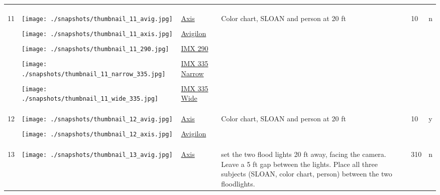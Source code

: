 \documentclass{article}%
\begin{document}
\begin{longtabu}{m{2.5cm} m{4cm} m{2cm} m{4cm} m{2cm} m{2cm}}
&&&&&\\%
&&&&&\\%
\hline%
&&&&&\\%
11&\texttt{[image: ./snapshots/thumbnail\_11\_avig.jpg]}&\href{https://drive.google.com/file/d/1W6dFHP7HQJ4QoIpgM2EtNyqKn5k4SNRU/view?usp=sharing}{Axis}&Color chart, SLOAN and person at 20 ft&10&n\\%
&&&&&\\%
&\texttt{[image: ./snapshots/thumbnail\_11\_axis.jpg]}&\href{https://drive.google.com/file/d/1yZfgjzj-YLJWCmQWwxPci34Pwg6di89s/view?usp=sharing}{Avigilon}&&&\\%
&&&&&\\%
&\texttt{[image: ./snapshots/thumbnail\_11\_290.jpg]}&\href{https://drive.google.com/file/d/1lsPoPlqaHDXXYc023AvWvS7iqQAY0pnQ/view?usp=sharing}{IMX 290}&&&\\%
&&&&&\\%
&\texttt{[image: ./snapshots/thumbnail\_11\_narrow\_335.jpg]}&\href{https://drive.google.com/file/d/1LoEW2xSsvm09DzviGuoz4PA_wF0fnxzy/view?usp=sharing}{IMX 335 Narrow}&&&\\%
&&&&&\\%
&\texttt{[image: ./snapshots/thumbnail\_11\_wide\_335.jpg]}&\href{https://drive.google.com/file/d/1FzmykcKnsG6wl9Zqh4BDBGeRPUZqVfc6/view?usp=sharing}{IMX 335 Wide}&&&\\%
&&&&&\\%
&&&&&\\%
\hline%
&&&&&\\%
12&\texttt{[image: ./snapshots/thumbnail\_12\_avig.jpg]}&\href{https://drive.google.com/file/d/1EOLpj27xyZ4Zt56Bh_ZrP4mSC3IlwukH/view?usp=sharing}{Axis}&Color chart, SLOAN and person at 20 ft&10&y\\%
&&&&&\\%
&\texttt{[image: ./snapshots/thumbnail\_12\_axis.jpg]}&\href{https://drive.google.com/file/d/1pjwAKJIEH6E4j6cPBU3F90JDgGvxbyOC/view?usp=sharing}{Avigilon}&&&\\%
&&&&&\\%
&&&&&\\%
\hline%
&&&&&\\%
13&\texttt{[image: ./snapshots/thumbnail\_13\_avig.jpg]}&\href{https://drive.google.com/file/d/14I38zQOl8fZOZpiK4yDhh_XuDKW8F3He/view?usp=sharing}{Axis}&set the two flood lights 20 ft away, facing the camera. Leave a 5 ft gap between the lights. Place all three subjects (SLOAN, color chart, person) between the two floodlights.&310&n\\%

\end{longtabu}
\end{document}
